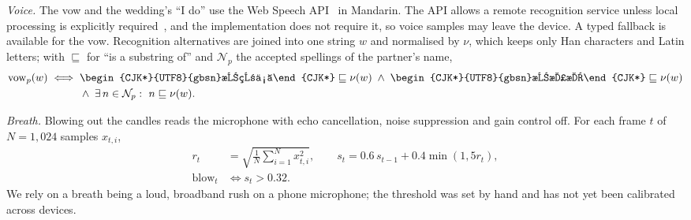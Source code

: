 \documentclass[sigconf,nonacm]{acmart}
\newcommand{\zh}[1]{\begingroup\normalfont\begin{CJK*}{UTF8}{gbsn}#1\end{CJK*}\endgroup}
\begin{document}
\emph{Voice.} The vow and the wedding's ``I do'' use the Web Speech API~\cite{w3c2023speech} in
Mandarin. The API allows a remote recognition service unless local processing is explicitly
required~\cite{w3c2023speech}, and the implementation does not require it, so voice samples may
leave the device. A typed fallback is available for the vow. Recognition alternatives are joined into one string $w$ and normalised
by $\nu$, which keeps only Han characters and Latin letters; with $\sqsubseteq$ for ``is a substring
of'' and $\mathcal{N}_p$ the accepted spellings of the partner's name,
\begin{align}
  \mathrm{vow}_p(w) \iff\;& \text{\zh{我爱你}} \sqsubseteq \nu(w) \;\land\; \text{\zh{我愿意}} \sqsubseteq \nu(w) \label{eq:vow} \\
  &\land\; \exists\, n \in \mathcal{N}_p :\ n \sqsubseteq \nu(w) . \nonumber
\end{align}

\emph{Breath.} Blowing out the candles reads the microphone with echo cancellation, noise
suppression and gain control off. For each frame $t$ of $N = 1{,}024$ samples $x_{t,i}$,
\begin{align}
  r_t &= \sqrt{\tfrac{1}{N}\textstyle\sum_{i=1}^{N} x_{t,i}^{2}}, \qquad
  s_t = 0.6\, s_{t-1} + 0.4 \min(1, 5 r_t), \label{eq:breath} \\
  \mathrm{blow}_t &\iff s_t > 0.32 . \nonumber
\end{align}
We rely on a breath being a loud, broadband rush on a phone microphone; the threshold was set by
hand and has not yet been calibrated across devices.
\end{document}
